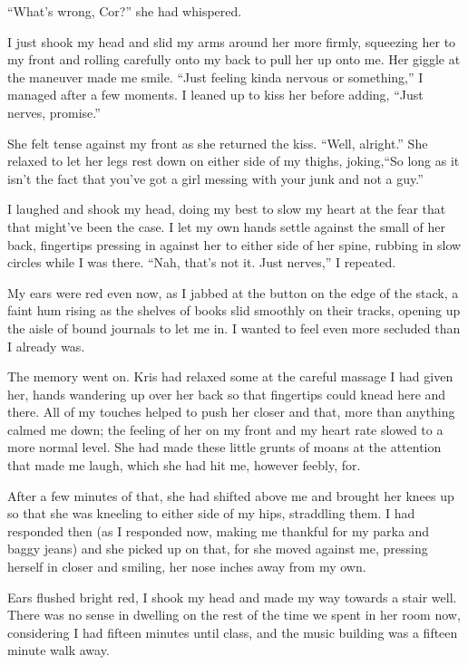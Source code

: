 ``What's wrong, Cor?'' she had whispered.

I just shook my head and slid my arms around her more firmly, squeezing her to my front and rolling carefully onto my back to pull her up onto me.  Her giggle at the maneuver made me smile.  ``Just feeling kinda nervous or something,'' I managed after a few moments.  I leaned up to kiss her before adding, ``Just nerves, promise.''

She felt tense against my front as she returned the kiss.  ``Well, alright.''  She relaxed to let her legs rest down on either side of my thighs, joking,``So long as it isn't the fact that you've got a girl messing with your junk and not a guy.''

I laughed and shook my head, doing my best to slow my heart at the fear that that might've been the case.  I let my own hands settle against the small of her back, fingertips pressing in against her to either side of her spine, rubbing in slow circles while I was there.  ``Nah, that's not it.  Just nerves,'' I repeated.

My ears were red even now, as I jabbed at the button on the edge of the stack, a faint hum rising as the shelves of books slid smoothly on their tracks, opening up the aisle of bound journals to let me in.  I wanted to feel even more secluded than I already was.  

The memory went on.  Kris had relaxed some at the careful massage I had given her, hands wandering up over her back so that fingertips could knead here and there.  All of my touches helped to push her closer and that, more than anything calmed me down; the feeling of her on my front and my heart rate slowed to a more normal level.  She had made these little grunts of moans at the attention that made me laugh, which she had hit me, however feebly, for.

After a few minutes of that, she had shifted above me and brought her knees up so that she was kneeling to either side of my hips, straddling them.  I had responded then (as I responded now, making me thankful for my parka and baggy jeans) and she picked up on that, for she moved against me, pressing herself in closer and smiling, her nose inches away from my own.

Ears flushed bright red, I shook my head and made my way towards a stair well.  There was no sense in dwelling on the rest of the time we spent in her room now, considering I had fifteen minutes until class, and the music building was a fifteen minute walk away.

